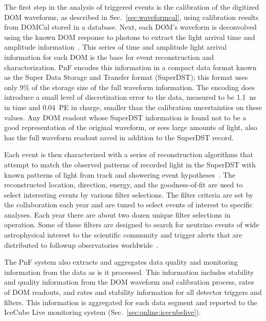 The first step in the analysis of triggered events is the calibration of
the digitized DOM waveforms, as described in Sec.~\ref{sec:waveformcal}, using
calibration results from DOMCal stored in a database.  Next, each
DOM's waveform is deconvolved using the known DOM response to photons to
extract the light arrival time and amplitude information~\cite{IC3:ereco}.
This series of time and amplitude light arrival information for each DOM is
the base for event reconstruction and characterization.  PnF encodes this
information in a compact data format known as the Super Data
Storage and Transfer format (SuperDST); this format uses only 9\% of the storage
size of the full waveform information.  The encoding does introduce a
small level of discretization error to the data, measured to be 1.1~ns in time and
0.04~PE in charge, smaller than the calibration uncertainties on these
values.  Any DOM readout whose SuperDST information is found not to be a
good representation of the original waveform, or sees large amounts of
light, also has the full waveform readout saved in addition to the
SuperDST record.


Each event is then characterized with a series of reconstruction
algorithms that attempt to match the observed patterns of recorded light in
the SuperDST with known patterns of light from track and showering event
hypotheses~\cite{IC3:ereco}.  The reconstructed location, direction,
energy, and the goodness-of-fit are used to select interesting events by various
filter selections.  The filter criteria are set by the collaboration
each year and are tuned to select events of interest to specific
analyses.  Each year there are about two dozen unique filter selections in
operation.  Some of these filters are designed to search for
neutrino events of wide astrophysical interest to the scientific community
and trigger alerts that are distributed to followup observatories
worldwide~\cite{Abbasi:2011ja,Aartsen:2015trq}.

The PnF system also extracts and aggregates data quality and monitoring
information from the data as is it processed.  This information includes
stability and quality information from the DOM waveform and calibration
process, rates of DOM readouts, and rates and 
stability information for all detector triggers and filters.  This
information is aggregated for each data segment and reported to the IceCube
Live monitoring system (Sec.~\ref{sec:online:icecubelive}).


